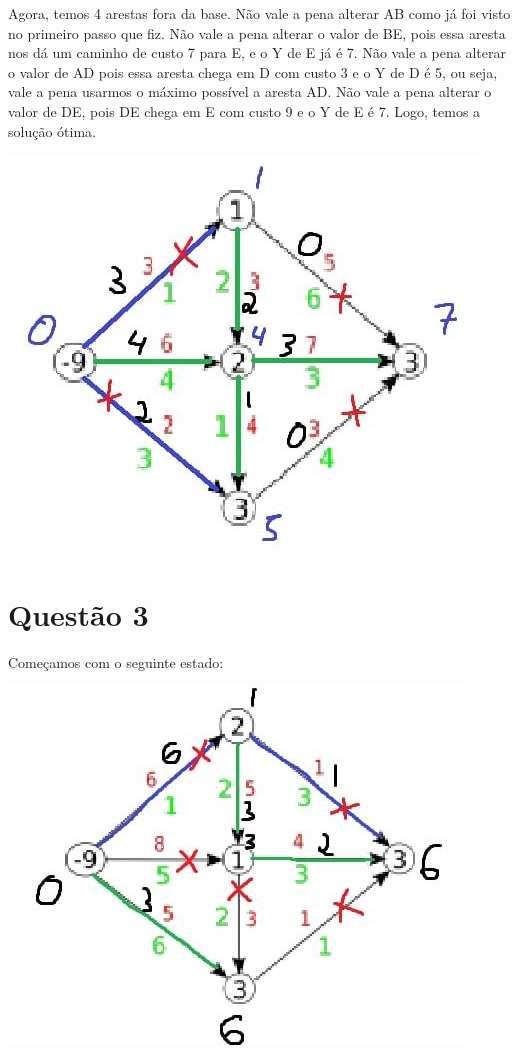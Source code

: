\documentclass[11pt]{article}
\begin{document}
\newpage
Agora, temos 4 arestas fora da base. Não vale a pena alterar AB como já foi visto no primeiro passo que fiz. Não vale a pena alterar o valor de BE, pois essa aresta nos dá um caminho de custo 7 para E, e o Y de E já é 7. Não vale a pena alterar o valor de AD pois essa aresta chega em D com custo 3 e o Y de D é 5, ou seja, vale a pena usarmos o máximo possível a aresta AD. Não vale a pena alterar o valor de DE, pois DE chega em E com custo 9 e o Y de E é 7. Logo, temos a solução ótima.
\begin{center}
\includegraphics[width=.9\linewidth]{23.jpg}
\end{center}

\newpage
\section{Questão 3}
\label{sec:org8f214be}
Começamos com o seguinte estado:
\begin{center}
\includegraphics[width=.9\linewidth]{31.jpg}
\end{center}
\end{document}
